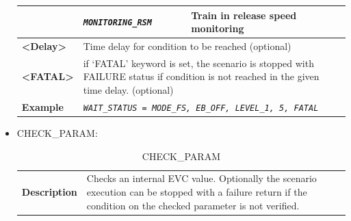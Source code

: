\documentclass{template/openetcs}
\begin{document}
\begin{itemize}
\begin{longtable}{|l|l|l|}
			\hline
	
			&	\begin{minipage}[t]{0.40\linewidth} \emph{\texttt{MONITORING\_RSM}} \end{minipage}
			&	\begin{minipage}[t]{0.38\linewidth} Train in release speed monitoring \end{minipage} \\ 
	
			\hline
							
				
				\begin{minipage}[t]{0.22\linewidth} \textbf{<Delay>} \end{minipage}
			&	\multicolumn{2}{l|}{ \begin{minipage}[t]{0.78\linewidth} Time delay for condition to be reached (optional) \end{minipage} } \\ 
	
			\hline
	
				
				\begin{minipage}[t]{0.22\linewidth} \textbf{<FATAL>} \end{minipage}
			&	\multicolumn{2}{l|}{	\begin{minipage}[t]{0.78\linewidth}	if ‘FATAL’ keyword is set, the scenario is stopped with FAILURE status if condition is not reached in the given time delay. (optional)	\end{minipage} } \\ 
	
			\hline
	
				
				\begin{minipage}[t]{0.22\linewidth} \textbf{Example} \end{minipage}
			&	\multicolumn{2}{l|}{ \begin{minipage}[t]{0.78\linewidth} \emph{\texttt{WAIT\_STATUS = MODE\_FS, EB\_OFF, LEVEL\_1, 5, FATAL}} \end{minipage} } \\ 
	
			\hline\hline

		\end{longtable}
		
	\item CHECK\_PARAM:
				
		\begin{longtable}{|l|l|l|}
			\caption{CHECK\_PARAM}\\ 
			\hline
			
				\begin{minipage}[t]{0.22\linewidth} \textbf{Description} \end{minipage} 
			&	\multicolumn{2}{l|}{ \begin{minipage}[t]{0.78\linewidth} Checks an internal EVC value. Optionally the scenario execution can be stopped with a failure return if the condition on the checked parameter is not verified. \end{minipage} } \\
															

\end{longtable}
\end{itemize}
\end{document}
